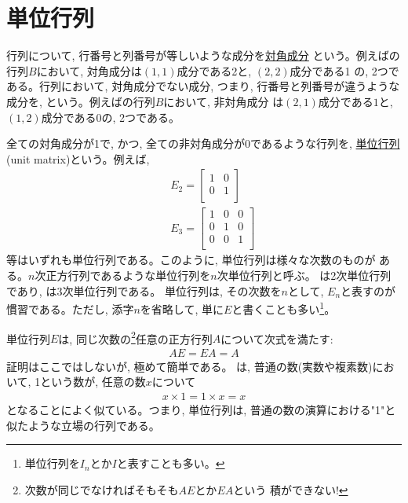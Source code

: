 \section{単位行列}
行列について, 行番号と列番号が等しいような成分を\underline{対角成分}
という。例えばの行列$B$において, 対角成分は$(1, 1)$成分である2と, $(2, 2)$成分である1
の, 2つである。行列において, 対角成分でない成分, つまり, 行番号と列番号が違うような成分を, 
という。例えばの行列$B$において, 非対角成分
は$(2, 1)$成分である$1$と, $(1, 2)$成分である0の, 2つである。

全ての対角成分が1で, かつ, 全ての非対角成分が0であるような行列を, 
\underline{単位行列} (unit matrix)という。例えば, 
\begin{eqnarray} 
&&E_2=\begin{bmatrix}
1 & 0 \\
0 & 1 \\
\end{bmatrix}\label{eq:matrix_2Dunit}\\
&&E_3=\begin{bmatrix}
1 & 0 & 0\\
0 & 1 & 0\\
0 & 0 & 1\\
\end{bmatrix}\label{eq:matrix_3Dunit}\end{eqnarray}
等はいずれも単位行列である。このように, 単位行列は様々な次数のものが
ある。$n$次正方行列であるような単位行列を$n$次単位行列と呼ぶ。
は2次単位行列であり, は3次単位行列である。
単位行列は, その次数を$n$として, $E_n$と表すのが慣習である。ただし, 添字$n$を省略して, 
単に$E$と書くことも多い\footnote{単位行列を$I_n$とか$I$と表すことも多い。}。

単位行列$E$は, 同じ次数の\footnote{次数が同じでなければそもそも$AE$とか$EA$という
積ができない!}任意の正方行列$A$について次式を満たす:
\begin{eqnarray}
AE=EA=A\label{eq:matrix_AE_EA_A}
\end{eqnarray}
証明はここではしないが, 極めて簡単である。
は, 普通の数(実数や複素数)において, 1という数が, 
任意の数$x$について
\begin{eqnarray}
x\times1=1\times x=x
\end{eqnarray}
となることによく似ている。つまり, 単位行列は, 普通の数の演算における"1"と
似たような立場の行列である。

